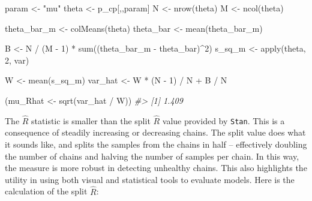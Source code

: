 \documentclass[11pt, oneside, openany]{scrbook}
\newenvironment{Shaded}{\begin{snugshade}}{\end{snugshade}}
\newcommand{\CommentTok}[1]{\textcolor[rgb]{0.56,0.35,0.01}{\textit{#1}}}
\newcommand{\DecValTok}[1]{\textcolor[rgb]{0.00,0.00,0.81}{#1}}
\newcommand{\FunctionTok}[1]{\textcolor[rgb]{0.00,0.00,0.00}{#1}}
\newcommand{\NormalTok}[1]{#1}
\newcommand{\OtherTok}[1]{\textcolor[rgb]{0.56,0.35,0.01}{#1}}
\newcommand{\SpecialCharTok}[1]{\textcolor[rgb]{0.00,0.00,0.00}{#1}}
\newcommand{\StringTok}[1]{\textcolor[rgb]{0.31,0.60,0.02}{#1}}
\begin{document}
\begin{Shaded}
\begin{Highlighting}[]
\NormalTok{param }\OtherTok{\textless{}{-}} \StringTok{"mu"}
\NormalTok{theta }\OtherTok{\textless{}{-}}\NormalTok{ p\_cp[,,param]}
\NormalTok{N     }\OtherTok{\textless{}{-}} \FunctionTok{nrow}\NormalTok{(theta)}
\NormalTok{M     }\OtherTok{\textless{}{-}} \FunctionTok{ncol}\NormalTok{(theta)}

\NormalTok{theta\_bar\_m }\OtherTok{\textless{}{-}} \FunctionTok{colMeans}\NormalTok{(theta)}
\NormalTok{theta\_bar   }\OtherTok{\textless{}{-}} \FunctionTok{mean}\NormalTok{(theta\_bar\_m)}

\NormalTok{B }\OtherTok{\textless{}{-}}\NormalTok{ N }\SpecialCharTok{/}\NormalTok{ (M }\SpecialCharTok{{-}} \DecValTok{1}\NormalTok{) }\SpecialCharTok{*} \FunctionTok{sum}\NormalTok{((theta\_bar\_m }\SpecialCharTok{{-}}\NormalTok{ theta\_bar)}\SpecialCharTok{\^{}}\DecValTok{2}\NormalTok{)}
\NormalTok{s\_sq\_m }\OtherTok{\textless{}{-}} \FunctionTok{apply}\NormalTok{(theta, }\DecValTok{2}\NormalTok{, var)}

\NormalTok{W }\OtherTok{\textless{}{-}} \FunctionTok{mean}\NormalTok{(s\_sq\_m)}
\NormalTok{var\_hat }\OtherTok{\textless{}{-}}\NormalTok{ W }\SpecialCharTok{*}\NormalTok{ (N }\SpecialCharTok{{-}} \DecValTok{1}\NormalTok{) }\SpecialCharTok{/}\NormalTok{ N }\SpecialCharTok{+}\NormalTok{ B }\SpecialCharTok{/}\NormalTok{ N}

\NormalTok{(mu\_Rhat }\OtherTok{\textless{}{-}} \FunctionTok{sqrt}\NormalTok{(var\_hat }\SpecialCharTok{/}\NormalTok{ W))}
\CommentTok{\#\textgreater{} [1] 1.409}
\end{Highlighting}
\end{Shaded}


The \(\hat{R}\) statistic is smaller than the split \(\hat{R}\) value provided by \texttt{Stan}. This is a consequence of steadily increasing or decreasing chains. The split value does what it sounds like, and splits the samples from the chains in half -- effectively doubling the number of chains and halving the number of samples per chain. In this way, the measure is more robust in detecting unhealthy chains. This also highlights the utility in using both visual and statistical tools to evaluate models. Here is the calculation of the split \(\hat{R}\):

\end{document}
